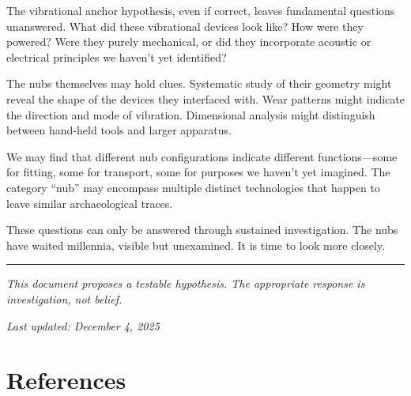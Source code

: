 \documentclass[11pt]{article}
\begin{document}
The vibrational anchor hypothesis, even if correct, leaves fundamental questions unanswered. What did these vibrational devices look like? How were they powered? Were they purely mechanical, or did they incorporate acoustic or electrical principles we haven't yet identified?

The nubs themselves may hold clues. Systematic study of their geometry might reveal the shape of the devices they interfaced with. Wear patterns might indicate the direction and mode of vibration. Dimensional analysis might distinguish between hand-held tools and larger apparatus.

We may find that different nub configurations indicate different functions—some for fitting, some for transport, some for purposes we haven't yet imagined. The category ``nub'' may encompass multiple distinct technologies that happen to leave similar archaeological traces.

These questions can only be answered through sustained investigation. The nubs have waited millennia, visible but unexamined. It is time to look more closely.

\vspace{2em}
\hrule
\vspace{1em}

\textit{This document proposes a testable hypothesis. The appropriate response is investigation, not belief.}

\vspace{1em}
\textit{Last updated: December 4, 2025}

\section*{References}


\end{document}
